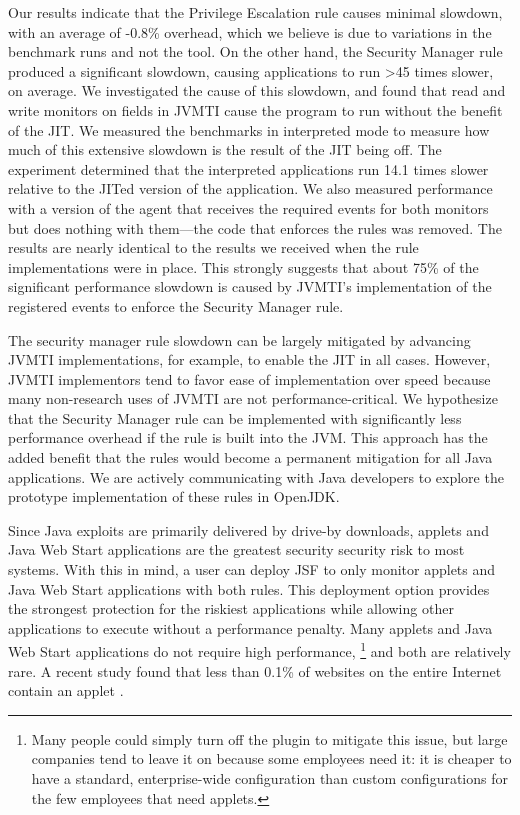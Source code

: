 \documentclass{sig-alternate}
\begin{document}
Our results indicate that the Privilege Escalation rule causes minimal
slowdown, with an average of -0.8\% overhead, which we believe is
due to variations in the benchmark runs and not the tool. On the other
hand, the Security Manager rule produced a significant slowdown, causing
applications to run >45 times slower, on average. We investigated
the cause of this slowdown, and found that read and write monitors
on fields in JVMTI cause the program to run without the benefit of
the JIT. We measured the benchmarks in interpreted mode to measure
how much of this extensive slowdown is the result of the JIT being
off. The experiment determined that the interpreted applications run
14.1 times slower relative to the JITed version of the application.
We also measured performance with a version of the agent that receives
the required events for both monitors but does nothing with them---the
code that enforces the rules was removed. The results are nearly identical
to the results we received when the rule implementations were in place.
This strongly suggests that about 75\% of the significant performance
slowdown is caused by JVMTI's implementation of the registered events
to enforce the Security Manager rule.

The security manager rule slowdown can be largely mitigated by advancing
JVMTI implementations, for example, to enable the JIT in all cases.
However, JVMTI implementors tend to favor ease of implementation over
speed because many non-research uses of JVMTI are not performance-critical.
We hypothesize that the Security Manager rule can be implemented with
significantly less performance overhead if the rule is built into
the JVM. This approach has the added benefit that the rules would
become a permanent mitigation for all Java applications. We are actively
communicating with Java developers to explore the prototype implementation
of these rules in OpenJDK.

Since Java exploits are primarily delivered by drive-by downloads,
applets and Java Web Start applications are the greatest security
security risk to most systems. With this in mind, a user can deploy
JSF to only monitor applets and Java Web Start applications with both
rules. This deployment option provides the strongest protection for
the riskiest applications while allowing other applications to execute
without a performance penalty. Many applets and Java Web Start applications
do not require high performance,%
\footnote{Many people could simply turn off the plugin to mitigate this issue,
but large companies tend to leave it on because some employees need
it: it is cheaper to have a standard, enterprise-wide configuration
than custom configurations for the few employees that need applets. %
} and both are relatively rare. A recent study found that less than
0.1\% of websites on the entire Internet contain an applet \cite{_applet_usage_stats}.
\end{document}
